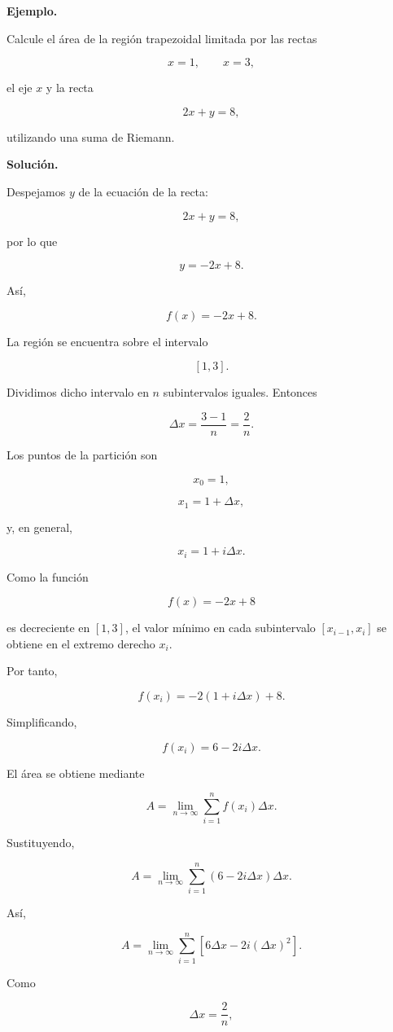 \documentclass[12pt]{article}
\newenvironment{Ejem}
{\par\medskip\noindent\textbf{Ejemplo.}\ }
{\par\medskip}
\begin{document}
\begin{Ejem}

Calcule el área de la región trapezoidal limitada por las rectas

\[
x=1,
\qquad
x=3,
\]

el eje $x$ y la recta

\[
2x+y=8,
\]

utilizando una suma de Riemann.

\textbf{Solución.}

Despejamos $y$ de la ecuación de la recta:

\[
2x+y=8,
\]

por lo que

\[
y=-2x+8.
\]

Así,

\[
f(x)=-2x+8.
\]

La región se encuentra sobre el intervalo

\[
[1,3].
\]

Dividimos dicho intervalo en $n$ subintervalos iguales. Entonces

\[
\Delta x
=
\frac{3-1}{n}
=
\frac{2}{n}.
\]

Los puntos de la partición son

\[
x_0=1,
\]

\[
x_1=1+\Delta x,
\]

y, en general,

\[
x_i=1+i\Delta x.
\]

Como la función

\[
f(x)=-2x+8
\]

es decreciente en $[1,3]$, el valor mínimo en cada subintervalo
$[x_{i-1},x_i]$ se obtiene en el extremo derecho $x_i$.

Por tanto,

\[
f(x_i)
=
-2(1+i\Delta x)+8.
\]

Simplificando,

\[
f(x_i)
=
6-2i\Delta x.
\]

El área se obtiene mediante

\[
A
=
\lim_{n\to\infty}
\sum_{i=1}^{n}
f(x_i)\Delta x.
\]

Sustituyendo,

\[
A
=
\lim_{n\to\infty}
\sum_{i=1}^{n}
\left(
6-2i\Delta x
\right)\Delta x.
\]

Así,

\[
A
=
\lim_{n\to\infty}
\sum_{i=1}^{n}
\left[
6\Delta x
-
2i(\Delta x)^2
\right].
\]

Como

\[
\Delta x=\frac{2}{n},
\]


\end{Ejem}
\end{document}
